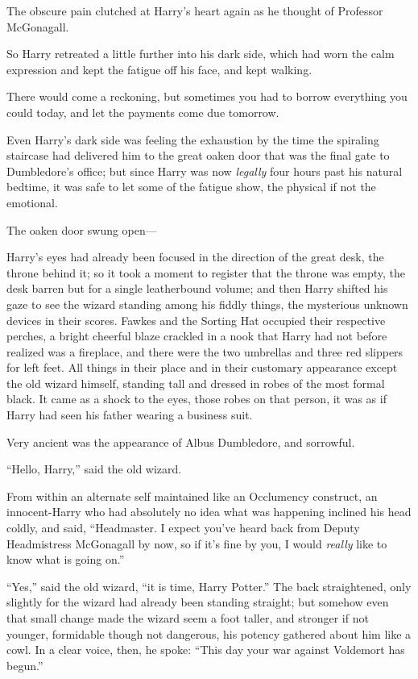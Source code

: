 The obscure pain clutched at Harry’s heart again as he thought of Professor McGonagall.

So Harry retreated a little further into his dark side, which had worn the calm expression and kept the fatigue off his face, and kept walking.

There would come a reckoning, but sometimes you had to borrow everything you could today, and let the payments come due tomorrow.

\later

Even Harry’s dark side was feeling the exhaustion by the time the spiraling staircase had delivered him to the great oaken door that was the final gate to Dumbledore’s office; but since Harry was now \emph{legally} four hours past his natural bedtime, it was safe to let some of the fatigue show, the physical if not the emotional.

The oaken door swung open—

Harry’s eyes had already been focused in the direction of the great desk, the throne behind it; so it took a moment to register that the throne was empty, the desk barren but for a single leatherbound volume; and then Harry shifted his gaze to see the wizard standing among his fiddly things, the mysterious unknown devices in their scores. Fawkes and the Sorting Hat occupied their respective perches, a bright cheerful blaze crackled in a nook that Harry had not before realized was a fireplace, and there were the two umbrellas and three red slippers for left feet. All things in their place and in their customary appearance except the old wizard himself, standing tall and dressed in robes of the most formal black. It came as a shock to the eyes, those robes on that person, it was as if Harry had seen his father wearing a business suit.

Very ancient was the appearance of Albus Dumbledore, and sorrowful.

“Hello, Harry,” said the old wizard.

From within an alternate self maintained like an Occlumency construct, an innocent-Harry who had absolutely no idea what was happening inclined his head coldly, and said, “Headmaster. I expect you’ve heard back from Deputy Headmistress McGonagall by now, so if it’s fine by you, I would \emph{really} like to know what is going on.”

“Yes,” said the old wizard, “it is time, Harry Potter.” The back straightened, only slightly for the wizard had already been standing straight; but somehow even that small change made the wizard seem a foot taller, and stronger if not younger, formidable though not dangerous, his potency gathered about him like a cowl. In a clear voice, then, he spoke: “This day your war against Voldemort has begun.”

